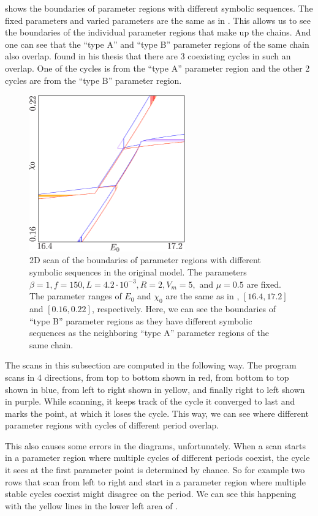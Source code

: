  shows the boundaries of parameter regions with different symbolic sequences.
The fixed parameters and varied parameters are the same as in .
This allows us to see the boundaries of the individual parameter regions that make up the chains.
And one can see that the ``type A'' and ``type B'' parameter regions of the same chain also overlap.
 found in his thesis that there are 3 coexisting cycles in such an overlap.
One of the cycles is from the ``type A'' parameter region and the other 2 cycles are from the ``type B'' parameter region.

\begin{figure}
	\centering
	\includegraphics[width=0.6\textwidth]{../Figures/2/2.6/result.png}
	\caption[2D scan of the boundaries of parameter regions with different symbolic sequences in the original model]{
		2D scan of the boundaries of parameter regions with different symbolic sequences in the original model.
		The parameters $\beta = 1, f = 150, L = 4.2 \cdot 10^{-3}, R = 2, V_m = 5,$ and $\mu = 0.5$ are fixed.
		The parameter ranges of $E_0$ and $\chi_0$ are the same as in , $[16.4, 17.2]$ and $[0.16, 0.22]$, respectively.
		Here, we can see the boundaries of ``type B'' parameter regions as they have different symbolic sequences as the neighboring ``type A'' parameter regions of the same chain.
	}
	\label{fig:etup.og.overlapping.regions.zoomed}
\end{figure}

The scans in this subsection are computed in the following way.
The program scans in 4 directions, from top to bottom shown in red, from bottom to top shown in blue, from left to right shown in yellow, and finally right to left shown in purple.
While scanning, it keeps track of the cycle it converged to last and marks the point, at which it loses the cycle.
This way, we can see where different parameter regions with cycles of different period overlap.

This also causes some errors in the diagrams, unfortunately.
When a scan starts in a parameter region where multiple cycles of different periods coexist, the cycle it sees at the first parameter point is determined by chance.
So for example two rows that scan from left to right and start in a parameter region where multiple stable cycles coexist might disagree on the period.
We can see this happening with the yellow lines in the lower left area of .
